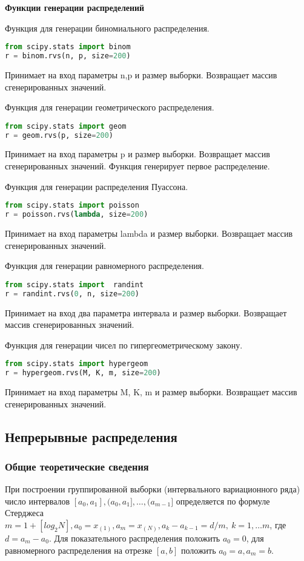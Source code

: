 \textbf{Функции генерации распределений}

Функция для генерации биномиального распределения.
\begin{lstlisting}[language=Python]
from scipy.stats import binom
r = binom.rvs(n, p, size=200)
\end{lstlisting}
Принимает на вход параметры n,p и размер выборки. Возвращает массив сгенерированных значений.


Функция для генерации геометрического распределения.
\begin{lstlisting}[language=Python]
from scipy.stats import geom 
r = geom.rvs(p, size=200)
\end{lstlisting}
Принимает на вход параметры p и размер выборки. Возвращает массив сгенерированных значений.
Функция генерирует первое распределение. 

Функция для генерации распределения Пуассона.
\begin{lstlisting}[language=Python]
from scipy.stats import poisson 
r = poisson.rvs(lambda, size=200)
\end{lstlisting}
Принимает на вход параметры lambda и размер выборки. Возвращает массив сгенерированных значений.

Функция для генерации равномерного распределения.
\begin{lstlisting}[language=Python]
from scipy.stats import  randint
r = randint.rvs(0, n, size=200)
\end{lstlisting}
Принимает на вход два параметра интервала и размер выборки. Возвращает массив сгенерированных значений.

Функция для генерации чисел по гипергеометрическому закону.
\begin{lstlisting}[language=Python]
from scipy.stats import hypergeom 
r = hypergeom.rvs(M, K, m, size=200)
\end{lstlisting}
Принимает на вход параметры M, K, m и размер выборки. Возвращает массив сгенерированных значений.

\subsection{Непрерывные распределения}
\subsubsection{Общие теоретические сведения}

При построении группированной выборки (интервального вариационного ряда) число интервалов $[a_0, a_1], (a_0, a_1], \dots, (a_{m-1}]$
определяется по формуле Стерджеса $m=1+[log_{2}N], a_0=x_{(1)}, a_m = x_{(N)}, a_k - a_{k-1} = d/m,\ k=1,\dots m$, где
$d=a_m - a_0$. Для показательного распределения положить $a_0=0$, для равномерного распределения на отрезке $[a,b]$ положить 
$a_0=a, a_m = b$.


